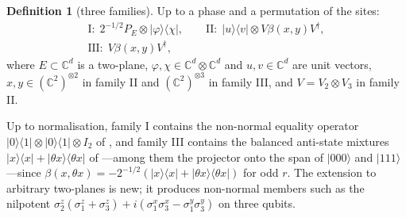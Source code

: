 \documentclass[aps,pra,twocolumn,superscriptaddress,nofootinbib,longbibliography]{revtex4-2}
\newcommand{\C}{\mathbb C}
\newcommand{\ket}[1]{|#1\rangle}
\newcommand{\bra}[1]{\langle #1|}
\theoremstyle{plain}
\theoremstyle{definition}
\newtheorem{definition}[theorem]{Definition}
\theoremstyle{remark}
\begin{document}
\begin{definition}[three families]\label{def:families}
Up to a phase and a permutation of the sites:
\begin{gather*}
\text{I:}\ \ 2^{-1/2}P_E\otimes\ket\varphi\bra\chi,\qquad
\text{II:}\ \ \ket u\bra v\otimes V\beta(x,y)V^\dagger,\\
\text{III:}\ \ V\beta(x,y)V^\dagger,
\end{gather*}
where $E\subset\C^d$ is a two-plane, $\varphi,\chi\in\C^d\otimes\C^d$ and $u,v\in\C^d$ are unit vectors, $x,y\in(\C^2)^{\otimes2}$ in family II and $(\C^2)^{\otimes3}$ in family III, and $V=V_2\otimes V_3$ in family II.
\end{definition}
Up to normalisation, family I contains the non-normal equality operator $\ket0\bra1\otimes\ket0\bra1\otimes I_2$ of \cite[Prop.~8.1]{WuZou}, and family III contains the balanced anti-state mixtures $\ket x\bra x+\ket{\theta x}\bra{\theta x}$ of \cite[Prop.~8.2]{WuZou}---among them the projector onto the span of $\ket{000}$ and $\ket{111}$---since $\beta(x,\theta x)=-2^{-1/2}(\ket x\bra x+\ket{\theta x}\bra{\theta x})$ for odd $r$. The extension to arbitrary two-planes is new; it produces non-normal members such as the nilpotent $\sigma^z_2(\sigma^z_1+\sigma^z_3)+i(\sigma^x_1\sigma^x_3-\sigma^y_1\sigma^y_3)$ on three qubits.
\end{document}
